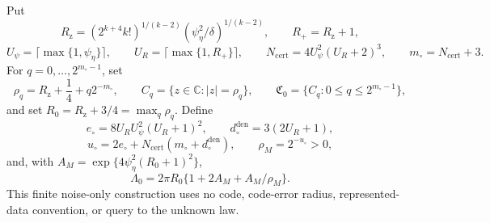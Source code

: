Put
\[
 R_{\mathrm z}=(2^{k+4}k!)^{1/(k-2)}
 (\psi_\eta^2/\delta)^{1/(k-2)},\qquad R_+=R_{\mathrm z}+1,
\]
\[
 U_\psi=\lceil\max\{1,\psi_\eta\}\rceil,\qquad
 U_R=\lceil\max\{1,R_+\}\rceil,\qquad
 N_{\mathrm{cert}}=4U_\psi^2(U_R+2)^3,\qquad
 m_\circ=N_{\mathrm{cert}}+3.
\]
For \(q=0,\ldots,2^{m_\circ-1}\), set
\[
 \rho_q=R_{\mathrm z}+\frac14+q2^{-m_\circ},
 \qquad C_q=\{z\in\mathbb C:|z|=\rho_q\},
 \qquad \mathfrak C_0=\{C_q:0\le q\le2^{m_\circ-1}\},
\]
and set \(R_0=R_{\mathrm z}+3/4=\max_q\rho_q\). Define
\[
 e_\circ=8U_RU_\psi^2(U_R+1)^2,\qquad
 d_\circ^{\mathrm{den}}=3(2U_R+1),
\]
\[
 u_\circ=2e_\circ+N_{\mathrm{cert}}(m_\circ+d_\circ^{\mathrm{den}}),
 \qquad \rho_M=2^{-u_\circ}>0,
\]
and, with \(A_M=\exp\{4\psi_\eta^2(R_0+1)^2\}\),
\[
 \Lambda_0=2\pi R_0\{1+2A_M+A_M/\rho_M\}.
\]
This finite noise-only construction uses no code, code-error radius, represented-data convention, or query to the unknown law.